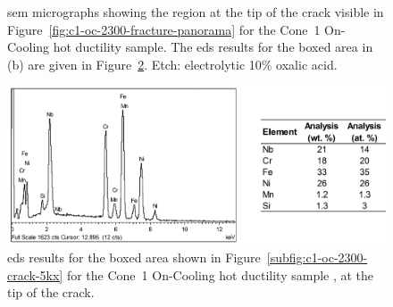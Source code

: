 {\begin{figure}
    \caption[\Gls{sem} micrographs showing the region at the tip of the crack visible in Figure~\ref{fig:c1-oc-2300-fracture-panorama} for the Cone~1 On-Cooling \protect{} hot ductility sample.]{\Gls{sem} micrographs showing the region at the tip of the crack visible in Figure~\ref{fig:c1-oc-2300-fracture-panorama} for the Cone~1 On-Cooling \protect{} hot ductility sample. The \gls{eds} results for the boxed area in (b) are given in Figure~\ref{fig:c1-oc-2300-crack-tip-particles-eds}. Etch: electrolytic 10\% oxalic acid.}
    \label{fig:c1-oc-2300-crack-sem}
\end{figure}

\begin{figure}
    \centering
    \includegraphics[width=\textwidth]{figures/metallography/c1-oc-2300-crack-tip-particles-eds-table.png}
    \caption{\Gls{eds} results for the boxed area shown in Figure~\ref{subfig:c1-oc-2300-crack-5kx} for the Cone~1 On-Cooling \protect{} hot ductility sample , at the tip of the crack.}
    \label{fig:c1-oc-2300-crack-tip-particles-eds}
\end{figure}


}
